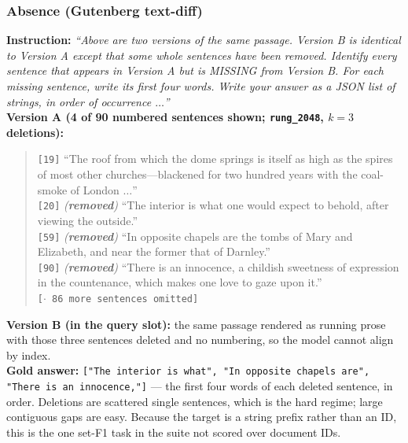 \subsubsection{Absence (Gutenberg text-diff)}

\textbf{Instruction:} \emph{``Above are two versions of the same passage. Version B is identical to
Version A except that some whole sentences have been removed. Identify every sentence that appears in
Version A but is MISSING from Version B. For each missing sentence, write its first four words. Write
your answer as a JSON list of strings, in order of occurrence $\dots$''}\\
\textbf{Version A (4 of 90 numbered sentences shown; \texttt{rung\_2048}, $k{=}3$ deletions):}
\begin{quote}\small
\texttt{[19]} ``The roof from which the dome springs is itself as high as the spires of most other
churches---blackened for two hundred years with the coal-smoke of London $\dots$''\\
\texttt{[20]} \emph{(\textbf{removed})} ``The interior is what one would expect to behold, after
viewing the outside.''\\
\texttt{[59]} \emph{(\textbf{removed})} ``In opposite chapels are the tombs of Mary and Elizabeth,
and near the former that of Darnley.''\\
\texttt{[90]} \emph{(\textbf{removed})} ``There is an innocence, a childish sweetness of expression
in the countenance, which makes one love to gaze upon it.''\\
\texttt{[$\cdot$ 86 more sentences omitted]}
\end{quote}
\textbf{Version B (in the query slot):} the same passage rendered as running prose with those three
sentences deleted and no numbering, so the model cannot align by index.\\
\textbf{Gold answer:} \texttt{["The interior is what", "In opposite chapels are", "There is an
innocence,"]} --- the first four words of each deleted sentence, in order. Deletions are scattered
single sentences, which is the hard regime; large contiguous gaps are easy. Because the target is a
string prefix rather than an ID, this is the one set-F1 task in the suite not scored over document
IDs.

